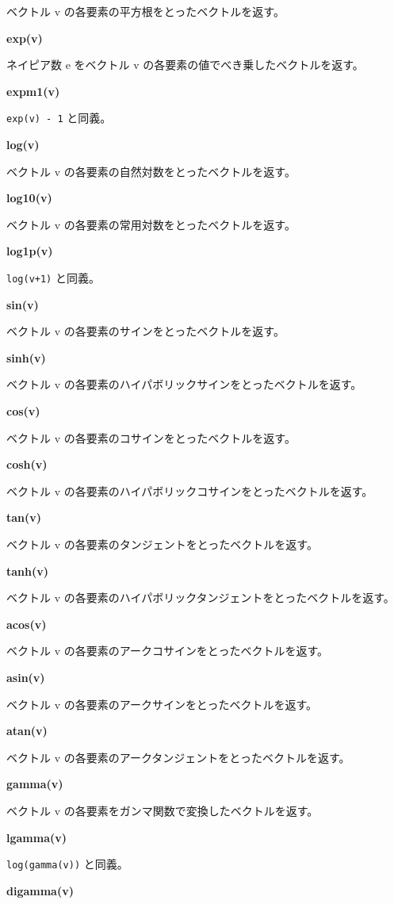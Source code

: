 \documentclass[]{book}
\begin{document}
ベクトル v の各要素の平方根をとったベクトルを返す。

\textbf{exp(v)}

ネイピア数 e をベクトル v の各要素の値でべき乗したベクトルを返す。

\textbf{expm1(v)}

\texttt{exp(v)\ -\ 1} と同義。

\textbf{log(v)}

ベクトル v の各要素の自然対数をとったベクトルを返す。

\textbf{log10(v)}

ベクトル v の各要素の常用対数をとったベクトルを返す。

\textbf{log1p(v)}

\texttt{log(v+1)} と同義。

\textbf{sin(v)}

ベクトル v の各要素のサインをとったベクトルを返す。

\textbf{sinh(v)}

ベクトル v の各要素のハイパボリックサインをとったベクトルを返す。

\textbf{cos(v)}

ベクトル v の各要素のコサインをとったベクトルを返す。

\textbf{cosh(v)}

ベクトル v の各要素のハイパボリックコサインをとったベクトルを返す。

\textbf{tan(v)}

ベクトル v の各要素のタンジェントをとったベクトルを返す。

\textbf{tanh(v)}

ベクトル v の各要素のハイパボリックタンジェントをとったベクトルを返す。

\textbf{acos(v)}

ベクトル v の各要素のアークコサインをとったベクトルを返す。

\textbf{asin(v)}

ベクトル v の各要素のアークサインをとったベクトルを返す。

\textbf{atan(v)}

ベクトル v の各要素のアークタンジェントをとったベクトルを返す。

\textbf{gamma(v)}

ベクトル v の各要素をガンマ関数で変換したベクトルを返す。

\textbf{lgamma(v)}

\texttt{log(gamma(v))} と同義。

\textbf{digamma(v)}
\end{document}
